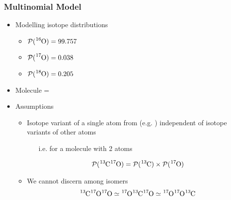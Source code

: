 \documentclass[xetex]{beamer}
\begin{document}
	\begin{frame}\frametitle{Multinomial Model}

		\begin{itemize}
			\item Modelling isotope distributions
			\begin{itemize}
				\item $\prob( \cem{^{16}O} ) = 99.757$
				\item $\prob( \cem{^{17}O} ) = 0.038$
				\item $\prob( \cem{^{18}O} ) = 0.205$
			\end{itemize}
			\item Molecule = \molecule
			\item Assumptions
			\begin{itemize}
				\item Isotope variant of a single atom from \molecule  (e.g. ) independent of isotope variants of other atoms
				\begin{itemize}
					\item[i.e.]  for a molecule with 2 atoms
				\end{itemize}				  
				$$\prob( \cem{^{13}C ^{17}O} ) = 
					\prob( \cem{^{13}C} ) \times \prob( \cem{ ^{17}O} ) $$
				\item We cannot discern among isomers
				$$ \cem{^{13}C ^{17}O ^{17}O} \simeq \cem{^{17}O ^{13}C ^{17}O} \simeq \cem{ ^{17}O ^{17}O ^{13}C }$$	
			\end{itemize}
		\end{itemize}

	\end{frame}
\end{document}
